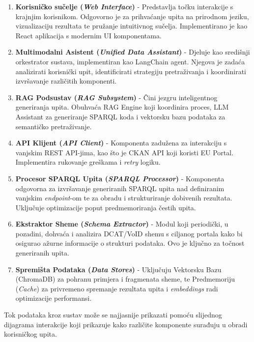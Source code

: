 \begin{enumerate}
    \item \textbf{Korisničko sučelje (\textit{Web Interface})} - Predstavlja točku interakcije s krajnjim korisnikom. Odgovorno je za prihvaćanje upita na prirodnom jeziku, vizualizaciju rezultata te pružanje intuitivnog sučelja. Implementirano je kao React aplikacija s modernim UI komponentama.
    
    \item \textbf{Multimodalni Asistent (\textit{Unified Data Assistant})} - Djeluje kao središnji orkestrator sustava, implementiran kao LangChain agent. Njegova je zadaća analizirati korisnički upit, identificirati strategiju pretraživanja i koordinirati izvršavanje različitih komponenti.
    
    \item \textbf{RAG Podsustav (\textit{RAG Subsystem})} - Čini jezgru inteligentnog generiranja upita. Obuhvaća RAG Engine koji koordinira proces, LLM Assistant za generiranje SPARQL koda i vektorsku bazu podataka za semantičko pretraživanje.
    
    \item \textbf{API Klijent (\textit{API Client})} - Komponenta zadužena za interakciju s vanjskim REST API-jima, kao što je CKAN API koji koristi EU Portal. Implementira rukovanje greškama i \textit{retry} logiku.
    
    \item \textbf{Procesor SPARQL Upita (\textit{SPARQL Processor})} - Komponenta odgovorna za izvršavanje generiranih SPARQL upita nad definiranim vanjskim \textit{endpoint}-om te za obradu i strukturiranje dobivenih rezultata. Uključuje optimizacije poput predmemoriranja čestih upita.
    
    \item \textbf{Ekstraktor Sheme (\textit{Schema Extractor})} - Modul koji periodički, u pozadini, dohvaća i analizira DCAT/VoID shemu s ciljanog portala kako bi osigurao ažurne informacije o strukturi podataka. Ovo je ključno za točnost generiranih upita.
    
    \item \textbf{Spremišta Podataka (\textit{Data Stores})} - Uključuju Vektorsku Bazu (ChromaDB) za pohranu primjera i fragmenata sheme, te Predmemoriju (\textit{Cache}) za privremeno spremanje rezultata upita i \textit{embeddings} radi optimizacije performansi.
\end{enumerate}

Tok podataka kroz sustav može se najjasnije prikazati pomoću slijednog dijagrama interakcije koji prikazuje kako različite komponente surađuju u obradi korisničkog upita.

